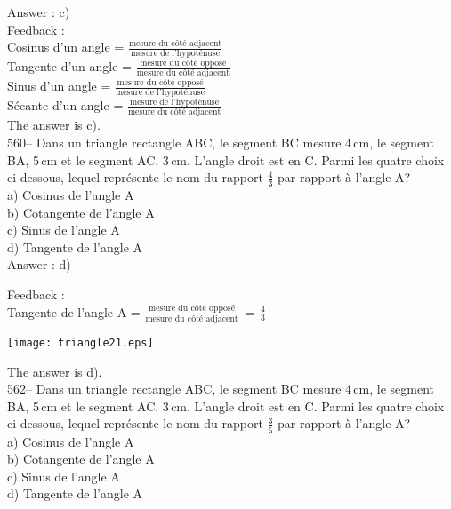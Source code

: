 ﻿\documentclass[letterpaper, 12pt]{article}
\begin{document}
Answer : c)\\

Feedback : \\
Cosinus d'un angle = $\frac{\textrm{mesure du c\^ot\'e
adjacent}}{\textrm{mesure de l'hypot\'enuse}}$\\[2mm]
Tangente d'un angle = $\frac{\textrm{mesure du c\^ot\'e
oppos\'e}}{\textrm{mesure du c\^ot\'e adjacent}}$\\[2mm]
Sinus d'un angle = $\frac{\textrm{mesure du c\^ot\'e
oppos\'e}}{\textrm{mesure de l'hypot\'enuse}}$\\[2mm]
S\'ecante d'un angle =  $\frac{\textrm{mesure de
l'hypot\'enuse}}{\textrm{mesure du c\^ot\'e adjacent}}$\\[2mm]
The answer is c).\\

560-- Dans un triangle rectangle ABC, le segment BC mesure 4\,cm, le segment
BA, 5\,cm et le segment AC, 3\,cm.  L'angle droit est en C.  Parmi les
quatre choix ci-dessous, lequel repr\'esente le nom du rapport $\frac{4}{3}$
par rapport \`a l'angle A?\\
a) Cosinus de l'angle A\\
b) Cotangente de l'angle A\\
c) Sinus de l'angle A\\
d) Tangente de l'angle A\\

Answer : d)

Feedback : \\
Tangente de l'angle A = $\frac{\textrm{mesure du c\^ot\'e
oppos\'e}}{\textrm{mesure du c\^ot\'e
adjacent}}\,=\,\frac{\textrm{4}}{\textrm{3}}$\\
    \begin{center}
    \texttt{[image: triangle21.eps]}
    \end{center}

The answer is d).\\


562-- Dans un triangle rectangle ABC, le segment BC mesure 4\,cm, le segment
BA, 5\,cm et le segment AC, 3\,cm.  L'angle droit est en C.  Parmi les
quatre choix ci-dessous, lequel repr\'esente le nom du rapport $\frac{3}{5}$
par rapport \`a l'angle A?\\
a) Cosinus de l'angle A\\
b) Cotangente de l'angle A\\
c) Sinus de l'angle A\\
d) Tangente de l'angle A\\
\end{document}
